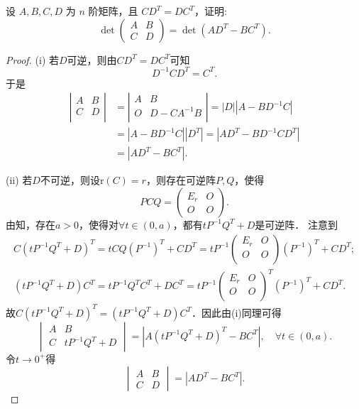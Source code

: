 \documentclass[../../main.tex]{subfiles}
\begin{document}
\begin{example}
设 \( A,B,C,D \) 为 \( n \) 阶矩阵，且 \( CD^T = DC^T \)，证明:
$$\det \begin{pmatrix} A & B \\ C & D \end{pmatrix} = \det(AD^T - BC^T).$$
\end{example}
\begin{proof}
(i) 若$D$可逆，则由$CD^T=DC^T$可知
$$D^{-1}CD^T=C^T.$$
于是
\begin{align*}
\left| \begin{matrix}
A&		B\\
C&		D\\
\end{matrix} \right|&=\left| \begin{matrix}
A&		B\\
O&		D-CA^{-1}B\\
\end{matrix} \right|=\left| D \right|\left| A-BD^{-1}C \right|
\\
&=\left| A-BD^{-1}C \right|\left| D^T \right|=\left| AD^T-BD^{-1}CD^T \right|
\\
&=\left| AD^T-BC^T \right|.
\end{align*}

(ii) 若$D$不可逆，则设$\text{r}(C)=r$，则存在可逆阵$P,Q$，使得
$$PCQ=\begin{pmatrix} E_r & O \\ O & O \end{pmatrix}.$$
由知，存在$a>0$，使得对$\forall t\in (0,a)$，都有$tP^{-1}Q^T+D$是可逆阵．
注意到
\begin{gather*}
C\left( tP^{-1}Q^T+D \right) ^T=tCQ\left( P^{-1} \right) ^T+CD^T=tP^{-1}\left( \begin{matrix}
E_r&		O\\
O&		O\\
\end{matrix} \right) \left( P^{-1} \right) ^T+CD^T;
\\
\left( tP^{-1}Q^T+D \right) C^T=tP^{-1}Q^TC^T+DC^T=tP^{-1}\left( \begin{matrix}
E_r&		O\\
O&		O\\
\end{matrix} \right) ^T\left( P^{-1} \right) ^T+CD^T.
\end{gather*}
故$C\left( tP^{-1}Q^T+D \right)^T=\left( tP^{-1}Q^T+D \right) C^T$．因此由(i)同理可得
$$\begin{vmatrix} A & B \\ C & tP^{-1}Q^T+D \end{vmatrix}=\left| A\left( tP^{-1}Q^T+D \right)^T-BC^T \right|,\quad \forall t\in (0,a).$$
令$t\rightarrow 0^+$得
$$\begin{vmatrix} A & B \\ C & D \end{vmatrix}=\left| AD^T-BC^T \right|.$$

\end{proof}
\end{document}
